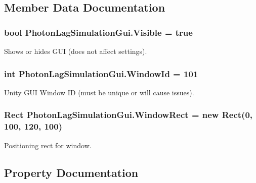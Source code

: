 \subsection{Member Data Documentation}
\subsubsection[{\texorpdfstring{Visible}{Visible}}]{\setlength{\rightskip}{0pt plus 5cm}bool Photon\+Lag\+Simulation\+Gui.\+Visible = true}\hypertarget{class_photon_lag_simulation_gui_ad790a872afa4c4c1b34401f55982203a}{}\label{class_photon_lag_simulation_gui_ad790a872afa4c4c1b34401f55982203a}


Shows or hides G\+UI (does not affect settings).

\subsubsection[{\texorpdfstring{Window\+Id}{WindowId}}]{\setlength{\rightskip}{0pt plus 5cm}int Photon\+Lag\+Simulation\+Gui.\+Window\+Id = 101}\hypertarget{class_photon_lag_simulation_gui_a0e20da80809bd2181828edabed39ccc9}{}\label{class_photon_lag_simulation_gui_a0e20da80809bd2181828edabed39ccc9}


Unity G\+UI Window ID (must be unique or will cause issues).

\subsubsection[{\texorpdfstring{Window\+Rect}{WindowRect}}]{\setlength{\rightskip}{0pt plus 5cm}Rect Photon\+Lag\+Simulation\+Gui.\+Window\+Rect = new Rect(0, 100, 120, 100)}\hypertarget{class_photon_lag_simulation_gui_a1d267bda81b30f6b32f77e4b5cc90649}{}\label{class_photon_lag_simulation_gui_a1d267bda81b30f6b32f77e4b5cc90649}


Positioning rect for window.



\subsection{Property Documentation}

